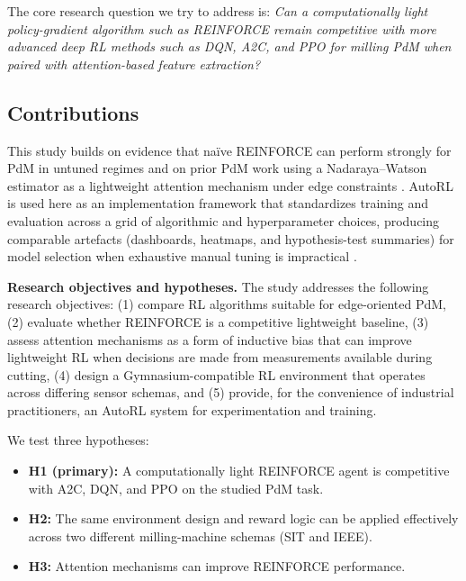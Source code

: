 \documentclass[sn-basic]{sn-jnl} %
\begin{document}
The core research question we try to address is: \emph{Can a computationally light policy-gradient algorithm such as \textsc{REINFORCE} remain competitive with more advanced deep RL methods such as \textsc{DQN}, \textsc{A2C}, and \textsc{PPO} for milling PdM when paired with attention-based feature extraction?}

\subsection{Contributions}

This study builds on evidence that na\"{i}ve \textsc{REINFORCE} can perform strongly for PdM in untuned regimes \cite{Siraskar2025} and on prior PdM work using a Nadaraya--Watson estimator as a lightweight attention mechanism under edge constraints \cite{Siraskar2024}. AutoRL is used here as an implementation framework that standardizes training and evaluation across a grid of algorithmic and hyperparameter choices, producing comparable artefacts (dashboards, heatmaps, and hypothesis-test summaries) for model selection when exhaustive manual tuning is impractical \cite{Schwartz2020, Strubell2019, Faust2019, Mussi2022}.

\textbf{Research objectives and hypotheses.}
The study addresses the following research objectives: (1) compare RL algorithms suitable for edge-oriented PdM, (2) evaluate whether \textsc{REINFORCE} is a competitive lightweight baseline, (3) assess attention mechanisms as a form of inductive bias that can improve lightweight RL when decisions are made from measurements available during cutting, (4) design a Gymnasium-compatible RL environment that operates across differing sensor schemas, and (5) provide, for the convenience of industrial practitioners, an AutoRL system for experimentation and training.

We test three hypotheses:
\begin{itemize}
		\item \textbf{H1 (primary):} A computationally light \textsc{REINFORCE} agent is competitive with \textsc{A2C}, \textsc{DQN}, and \textsc{PPO} on the studied PdM task.
		\item \textbf{H2:} The same environment design and reward logic can be applied effectively across two different milling-machine schemas (SIT and IEEE).
		\item \textbf{H3:} Attention mechanisms can improve \textsc{REINFORCE} performance.
\end{itemize}
\end{document}
